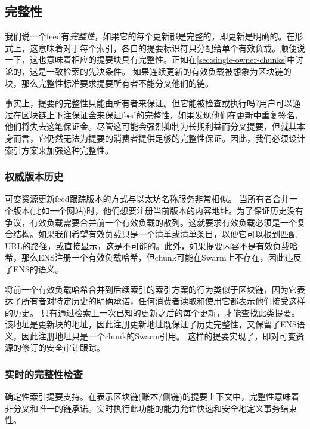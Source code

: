 \subsection{完整性\statusyellow}\label{sec:feed-integrity}

我们说一个feed有\emph{完整性}，如果它的每个更新都是完整的，即更新是明确的。在形式上，这意味着对于每个索引，各自的提要标识符只分配给单个有效负载。顺便说一下，这也意味着相应的提要块具有完整性。正如在\ref{sec:single-owner-chunks}中讨论的，这是一致检索的先决条件。
如果连续更新的有效负载被想象为区块链的块，那么完整性标准要求提要所有者不能分叉他们的链。

事实上，提要的完整性只能由所有者来保证。但它能被检查或执行吗?用户可以通过在区块链上下注保证金来保证feed的完整性，如果发现他们在更新中重复签名，他们将失去这笔保证金。尽管这可能会强烈抑制为长期利益而分叉提要，但就其本身而言，它仍然无法为提要的消费者提供足够的完整性保证。因此，我们必须设计索引方案来加强这种完整性。

\subsubsection{权威版本历史}

可变资源更新feed跟踪版本的方式与以太坊名称服务非常相似。
当所有者合并一个版本(比如一个网站)时，他们想要注册当前版本的内容地址。为了保证历史没有争议，有效负载需要合并前一个有效负载的散列。这就要求有效负载必须是一个复合结构。如果我们希望有效负载只是一个清单或清单条目，以便它可以根到匹配URL的路径，或直接显示，这是不可能的。此外，如果提要内容不是有效负载哈希，那么ENS注册一个有效负载哈希，但chunk可能在Swarm上不存在，因此违反了ENS的语义。

将前一个有效负载哈希合并到后续索引的索引方案的行为类似于区块链，因为它表达了所有者对特定历史的明确承诺，任何消费者读取和使用它都表示他们接受这样的历史。
只有通过检索上一次已知的更新之后的每个更新，才能查找此类提要。该地址是更新块的地址，因此注册更新地址既保证了历史完整性，又保留了ENS语义，因此注册地址只是一个chunk的Swarm引用。
这样的提要实现了，即对可变资源的修订的安全审计跟踪。 

\subsubsection{实时的完整性检查}

确定性索引提要支持。在表示区块链(账本/侧链)的提要上下文中，完整性意味着非分叉和唯一的链承诺。实时执行此功能的能力允许快速和安全地定义事务结束性。

